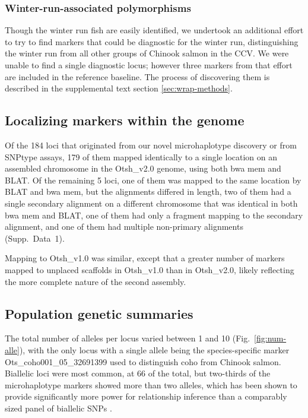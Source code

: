 \subsubsection*{Winter-run-associated polymorphisms}

Though the winter run fish are easily identified, we undertook an additional effort to
try to find markers that could be diagnostic for the winter run, distinguishing the
winter run from all other groups of Chinook salmon in the CCV.  We were unable to
find a single diagnostic locus; however three markers from that effort are included in
the reference baseline.  The process of discovering them is described in the
supplemental text section \ref{sec:wrap-methods}.

\subsection*{Localizing markers within the genome}

Of the 184 loci that originated from our novel
microhaplotype discovery or from SNPtype assays, 179 of them mapped identically to a single
location on an assembled chromosome in the Otsh\_v2.0 genome, using both bwa mem and BLAT.
Of the remaining 5 loci, one of them was mapped to the same location by BLAT and bwa mem, but
the alignments differed in length, two of them had a single secondary alignment on a different chromosome
that was identical in both bwa mem and BLAT, one of them had only a fragment mapping to
the secondary alignment, and one of them had multiple
non-primary alignments (Supp.~Data~1).

Mapping to Otsh\_v1.0 was similar, except that a greater number of markers mapped to unplaced
scaffolds in Otsh\_v1.0 than in Otsh\_v2.0, likely reflecting the more complete nature of the
second assembly.


\subsection*{Population genetic summaries}

The total number of alleles per locus varied between 1 and 10 (Fig.~\ref{fig:num-alle}), with the
only locus with a single allele being the species-specific marker Ots\_coho001\_05\_32691399
used to distinguish coho from Chinook salmon. Biallelic
loci were most common, at 66 of the total, but two-thirds of the microhaplotype markers
showed more than two alleles, which has been shown to provide significantly more
power for relationship inference than a comparably sized panel of biallelic SNPs
\citep{baetscher2018microhaplotypes}.


